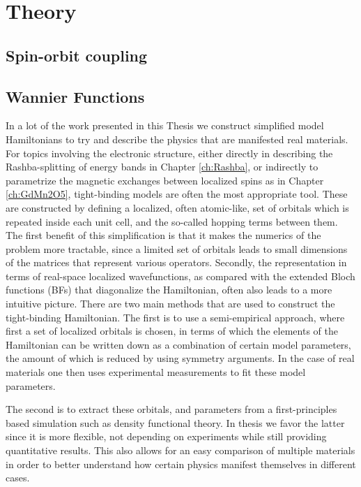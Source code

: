\chapter{Theory}
\section{Spin-orbit coupling}
\section{Wannier Functions}

In a lot of the work presented in this Thesis we construct simplified model Hamiltonians to try and describe the physics that are manifested real materials.
For topics involving the electronic structure, either directly in describing the Rashba-splitting of energy bands in Chapter \ref{ch:Rashba}, or indirectly to parametrize the magnetic exchanges between localized spins as in Chapter \ref{ch:GdMn2O5}, tight-binding models are often the most appropriate tool.
These are constructed by defining a localized, often atomic-like, set of orbitals which is repeated inside each unit cell, and the so-called hopping terms between them.
The first benefit of this simplification is that it makes the numerics of the problem more tractable, since a limited set of orbitals leads to small dimensions of the matrices that represent various operators.
Secondly, the representation in terms of real-space localized wavefunctions, as compared with the extended Bloch functions (BFs) that diagonalize the Hamiltonian, often also leads to a more intuitive picture.
There are two main methods that are used to construct the tight-binding Hamiltonian.
The first is to use a semi-empirical approach, where first a set of localized orbitals is chosen, in terms of which the elements of the Hamiltonian can be written down as a combination of certain model parameters, the amount of which is reduced by using symmetry arguments.
In the case of real materials one then uses experimental measurements to fit these model parameters.

The second is to extract these orbitals, and parameters from a first-principles based simulation such as density functional theory.
In thesis we favor the latter since it is more flexible, not depending on experiments while still providing quantitative results.
This also allows for an easy comparison of multiple materials in order to better understand how certain physics manifest themselves in different cases. 


